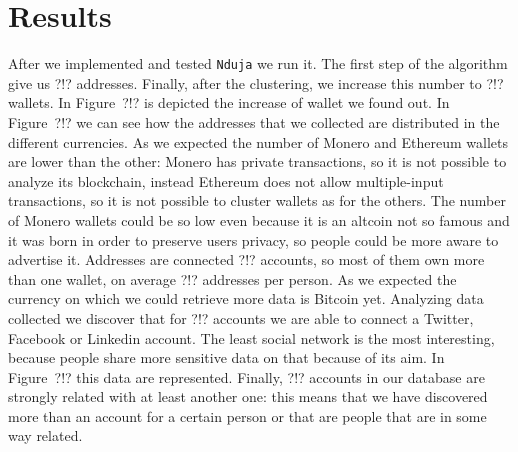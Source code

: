 \section{Results}
After we implemented and tested \texttt{Nduja} we run it. The first step of the
algorithm give us ?!? addresses. Finally, after the clustering, we increase
this number to ?!? wallets. In Figure~?!? is depicted the increase of wallet we
found out. In Figure~?!? we can see how the addresses that we collected are
distributed in the different currencies. As we expected the number of Monero
and Ethereum wallets are lower than the other: Monero has private transactions,
so it is not possible to analyze its blockchain, instead Ethereum does not
allow multiple-input transactions, so it is not possible to cluster wallets as
for the others. The number of Monero wallets could be so low even because it is
an altcoin not so famous and it was born in order to preserve users privacy, so
people could be more aware to advertise it. Addresses are connected ?!?
accounts, so most of them own more than one wallet, on average ?!? addresses
per person. As we expected the currency on which we could retrieve more data is
Bitcoin yet. Analyzing data collected we discover that for ?!? accounts we are
able to connect a Twitter, Facebook or Linkedin account. The least social
network is the most interesting, because people share more sensitive data on
that because of its aim. In Figure~?!? this data are represented. Finally, ?!? accounts in our database are strongly related with at least another one: this means that we have discovered more than an account for a certain person or that are people that are in some way related.